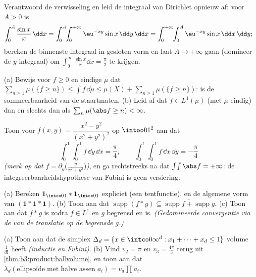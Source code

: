 \begin{exercise}[$\star$]\label{exo:b3:product:2}
Verantwoord de verwisseling en leid de integraal van Dirichlet
opnieuw af: voor $A > 0$ is
\[
\int_0^A\frac{\sin x}x\,\dd x
= \int_0^A\!\!\int_0^{+\infty}\eu^{-xy}\sin x\,\dd y\,\dd x
= \int_0^{+\infty}\!\!\int_0^A \eu^{-xy}\sin x\,\dd x\,\dd y;
\]
bereken de binnenste integraal in gesloten vorm en laat $A \to
+\infty$ gaan (domineer de $y$-integraal) om
$\int_0^\infty\frac{\sin x}x\dd x = \frac\pi2$ te krijgen.
\end{exercise}

\begin{exercise}[$\star\star$]\label{exo:b3:product:3}
(a) Bewijs voor  $f \geq 0$ en eindige $\mu$ dat
$\sum_{n\geq1}\mu(\{f \geq n\}) \leq \int f\,\dd\mu \leq \mu(X) +
\sum_{n\geq1}\mu(\{f\geq n\})$:  is de
sommeerbaarheid van de staartmaten.
(b) Leid af dat $f \in L^1(\mu)$ (met $\mu$ eindig) dan en slechts
dan als $\sum_n\mu(\abs f \geq n) < \infty$.
\end{exercise}

\begin{exercise}[$\star\star$]\label{exo:b3:product:4}
Toon voor $f(x, y) = \dfrac{x^2 - y^2}{(x^2 + y^2)^2}$ op
$\intoo01^2$ aan dat
\[
\int_0^1\!\!\int_0^1 f\,\dd y\,\dd x = \frac\pi4,
\qquad
\int_0^1\!\!\int_0^1 f\,\dd x\,\dd y = -\frac\pi4
\]
\emph{(merk op dat $f = \partial_y\bigl(\frac{y}{x^2+y^2}\bigr)$)},
en ga rechtstreeks na dat $\int\!\int\abs f = +\infty$: de
integreerbaarheidshypothese van Fubini is geen versiering.
\end{exercise}

\begin{exercise}[$\star\star$]\label{exo:b3:product:5}
(a) Bereken $\mathbf 1_{\intcc01} * \mathbf 1_{\intcc01}$
expliciet (een tentfunctie), en de algemene vorm van $(\mathbf 1 *
\mathbf 1 * \mathbf 1)$.
(b) Toon aan dat $\operatorname{supp}(f * g) \subseteq
\overline{\operatorname{supp}f + \operatorname{supp}g}$.
(c) Toon aan dat $f * g$  is zodra $f \in L^1$ en $g$
begrensd en  is. \emph{(Gedomineerde convergentie via de
 van de translatie op de begrensde $g$.)}
\end{exercise}

\begin{exercise}[$\star\star$]\label{exo:b3:product:6}
(a) Toon aan dat de simplex $\Delta_d = \{x \in \intco0\infty^d :
x_1 + \dots + x_d \leq 1\}$ volume $\frac1{d!}$ heeft
\emph{(inductie en Fubini)}.
(b) Vind $v_2 = \pi$ en $v_3 = \frac{4\pi}3$ terug uit
\cref{thm:b3:product:ballvolume}, en toon aan dat
$\lambda_d(\text{ellipsoïde met halve assen } a_i) = v_d\prod
a_i$.
\end{exercise}

